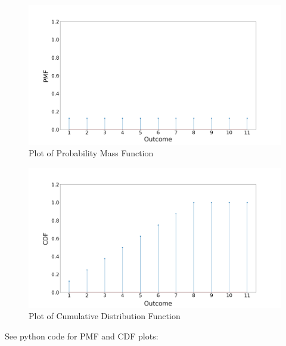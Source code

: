 \documentclass[journal,12pt,twocolumn]{IEEEtran}
\begin{document}
\begin{figure}
    \includegraphics[scale=0.15]{code/pmf.png}
\caption{Plot of Probability Mass Function}
\end{figure}

\begin{figure}
    \includegraphics[scale=0.15]{code/cdf.png}
\caption{Plot of Cumulative Distribution Function}
\end{figure}

See python code for PMF and CDF plots:\cite{plot}
\end{document}

